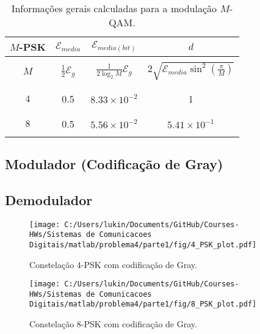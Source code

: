 \begin{table}[!ht]
    \centering
    \begin{tabular}{|c|c|c|c|}
    \hline
    $M$-PSK & $\mathcal{E}_{media}$ & $\mathcal{E}_{media(bit)}$ & $d$ \\ \hline
    & &  &  \\ 
    $M$ & $\frac{1}{2} \mathcal{E}_g$ & $ \frac{1}{2\log_2 M} \mathcal{E}_g$ & $2\sqrt{\mathcal{E}_{media} \sin^2\left(\frac{\pi}{M}\right) } $ \\ 
    & &  &  \\ \hline
    & &  &  \\ 
    $4$     & 0.5 & $ 8.33\times 10^{-2}$ & 1 \\ 
    & &  &  \\ \hline
    & &  &  \\ 
    $8$    & 0.5 & $5.56\times 10^{-2}$ & $5.41\times 10^{-1}$ \\ 
    & &  &  \\ \hline
    \end{tabular}
    \caption{Informações gerais calculadas para a modulação $M$-QAM.}
    \label{tab:Resume_PSK}
\end{table}

\clearpage

\subsection{Modulador (Codificação de Gray)}

\subsection{Demodulador}


\begin{figure}[!ht]
    \centering
    \texttt{[image: C:/Users/lukin/Documents/GitHub/Courses-HWs/Sistemas de Comunicacoes Digitais/matlab/problema4/parte1/fig/4\_PSK\_plot.pdf]}
    \caption{Constelação $4$-PSK com codificação de Gray.}
    \label{fig:4_PSK_plot}
\end{figure}

\begin{figure}[!ht]
    \centering
    \texttt{[image: C:/Users/lukin/Documents/GitHub/Courses-HWs/Sistemas de Comunicacoes Digitais/matlab/problema4/parte1/fig/8\_PSK\_plot.pdf]}
    \caption{Constelação $8$-PSK com codificação de Gray.}
    \label{fig:8_PSK_plot}
\end{figure}



